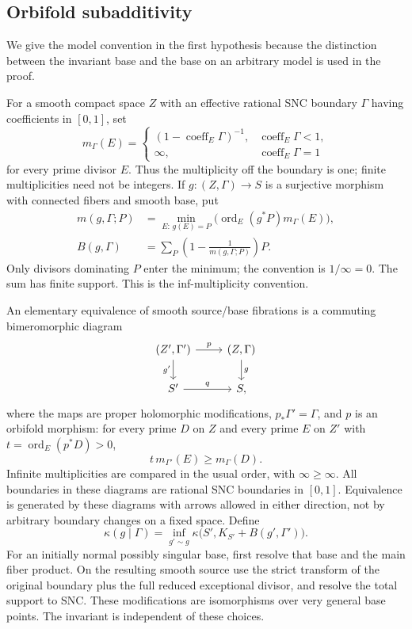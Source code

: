 \documentclass[11pt,letterpaper]{article}
\theoremstyle{definition}
\theoremstyle{remark}
\begin{document}
\subsection{Orbifold subadditivity}

We give the model convention in the first hypothesis because the
distinction between the invariant base and the base on an arbitrary
model is used in the proof.

For a smooth compact space \(Z\) with an effective rational SNC
boundary \(\Gamma\) having coefficients in \([0,1]\), set
\[
 m_\Gamma(E)=
 \begin{cases}
 (1-\operatorname{coeff}_E\Gamma)^{-1},&
                  \operatorname{coeff}_E\Gamma<1,\\
 \infty,&\operatorname{coeff}_E\Gamma=1
 \end{cases}
\]
for every prime divisor \(E\). Thus the multiplicity off the boundary
is one; finite multiplicities need not be integers. If
\(g:(Z,\Gamma)\to S\) is a surjective morphism with connected
fibers and smooth base, put
\begin{equation}\label{eq:orbifold-base}
 \begin{split}
 m(g,\Gamma;P)&=
   \min_{E:\,g(E)=P}\bigl(\operatorname{ord}_E(g^*P)m_\Gamma(E)\bigr),\\
 B(g,\Gamma)&=\sum_P\left(1-\frac1{m(g,\Gamma;P)}\right)P.
 \end{split}
\end{equation}
Only divisors dominating \(P\) enter the minimum; the convention is
\(1/\infty=0\). The sum has finite support. This is the
inf-multiplicity convention.

An elementary equivalence of smooth source/base fibrations is a
commuting bimeromorphic diagram
\[
\begin{tikzcd}
 (Z',\Gamma')\arrow[r,"p"]\arrow[d,"g'"']&
 (Z,\Gamma)\arrow[d,"g"]\\
 S'\arrow[r,"q"]&S,
\end{tikzcd}
\]
where the maps are proper holomorphic modifications,
\(p_*\Gamma'=\Gamma\), and \(p\) is an orbifold morphism: for
every prime \(D\) on \(Z\) and every prime \(E\) on \(Z'\) with
\(t=\operatorname{ord}_E(p^*D)>0\),
\begin{equation}\label{eq:orbifold-morphism}
 t\,m_{\Gamma'}(E)\ge m_\Gamma(D).
\end{equation}
Infinite multiplicities are compared in the usual order, with
\(\infty\ge\infty\). All boundaries in these diagrams are rational
SNC boundaries in \([0,1]\). Equivalence is generated by these
diagrams with arrows allowed in either direction, not by arbitrary
boundary changes on a fixed space. Define
\begin{equation}\label{eq:orbifold-invariant}
 \kappa(g\mid\Gamma)=
 \inf_{g'\sim g}\kappa\bigl(S',K_{S'}+B(g',\Gamma')\bigr).
\end{equation}
For an initially normal possibly singular base, first resolve that
base and the main fiber product. On the resulting smooth source use
the strict transform of the original boundary plus the full reduced
exceptional divisor, and resolve the total support to SNC. These
modifications are isomorphisms over very general base points. The
invariant is independent of these choices.
\end{document}
